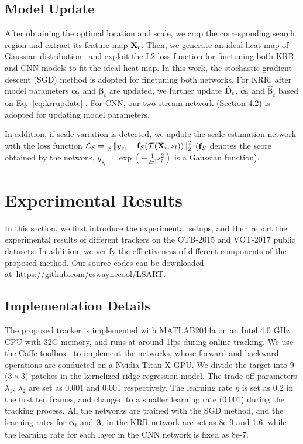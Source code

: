\documentclass[10pt,twocolumn,letterpaper]{article}
\begin{document}
\subsection{Model Update}
After obtaining the optimal location and scale, we crop the corresponding
search region and extract its feature map ${\bf X}_t$. Then, we generate
an ideal heat map of Gaussian distribution~\cite{henriques2015high} and
exploit the L2 loss function for finetuning both KRR and CNN models to
fit the ideal heat map. In this work, the stochastic gradient descent
(SGD) method is adopted for finetuning both networks.
For KRR, after model parameters ${\bm \alpha}_t$ and ${\bm \beta}_t$ are updated, we further update
${\bf \hat D}_t$, ${\hat {\bm \alpha}}_t$ and ${\hat {\bm \beta}}_t$ based on Eq.~\ref{eq:krrupdate} .
For CNN, our two-stream network (Section 4.2) is adopted for updating model parameters.

In addition, if scale variation is detected, we update the scale estimation network with the loss function ${{\cal L}_{\cal S}}
= \frac{1}{2}\left\| {{y}_{s_l} - {\bf{f}}_{\cal S}({\cal T}({{\bf{X}}_t},{s_l}))} \right\|_2^2$ (${\bf{f}}_{\cal S}$ denotes
the score obtained by the network, ${y_{{s_l}}} = \exp ( - \frac{1}{{2{\sigma ^2}}}s_l^2)$ is a Gaussian function).

\vspace{1mm}
\section{Experimental Results}
In this section, we first introduce the experimental setups, and then report the experimental
results of different trackers on the OTB-2015 and VOT-2017 public datasets.
In addition, we verify the effectiveness of different components of the proposed method.
Our source codes can be downloaded at~\url{https://github.com/cswaynecool/LSART}.

\subsection{Implementation Details}
The proposed tracker is implemented with MATLAB2014a on an Intel 4.0 GHz CPU
with 32G memory, and runs at around 1fps during online tracking.
We use the Caffe toolbox~\cite{jia2014caffe} to implement the networks, whose
forward and backward operations are conducted on a Nvidia Titan X GPU.
We divide the target into 9 ($3\times 3$) patches in the kernelized ridge
regression model. The trade-off parameters $\lambda_1$, $\lambda_2$
are set as 0.001 and 0.001 respectively.
The learning rate $\eta$ is set as $0.2$ in the first ten frames, and changed
to a smaller learning rate (\eg $0.001$) during the tracking process.
All the networks are trained with the SGD method, and the learning rates for
${\bm \alpha}_t$ and ${\bm \beta}_t$ in the KRR network are set as 8e-9 and
1.6, while the learning rate for each layer in the CNN network is fixed as
8e-7.
\end{document}
